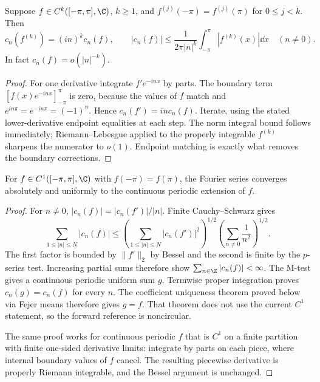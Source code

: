 \begin{theorem}
Suppose $f\in C^k([-\pi,\pi],\C)$, $k\geq1$, and
$f^{(j)}(-\pi)=f^{(j)}(\pi)$ for $0\leq j<k$. Then
\[
 c_n(f^{(k)})=(in)^k c_n(f),\qquad
 |c_n(f)|\leq\frac1{2\pi|n|^k}\int_{-\pi}^{\pi}|f^{(k)}(x)|\dd x
 \quad(n\ne0).
\]
In fact $c_n(f)=o(|n|^{-k})$.
\end{theorem}
\begin{proof}
For one derivative integrate $f'e^{-inx}$ by parts. The boundary term
$[f(x)e^{-inx}]_{-\pi}^{\pi}$ is zero, because the values of $f$ match
and $e^{in\pi}=e^{-in\pi}=(-1)^n$. Hence $c_n(f')=in c_n(f)$.
Iterate, using the stated lower-derivative endpoint equalities at each
step. The norm integral bound follows immediately; Riemann--Lebesgue
applied to the properly integrable $f^{(k)}$ sharpens the numerator to
$o(1)$. Endpoint matching is exactly what removes the boundary corrections.
\end{proof}

\begin{theorem}
For $f\in C^1([-\pi,\pi],\C)$ with $f(-\pi)=f(\pi)$,
the Fourier series converges absolutely and uniformly to the continuous
periodic extension of $f$.
\end{theorem}
\begin{proof}
For $n\ne0$, $|c_n(f)|=|c_n(f')|/|n|$. Finite Cauchy--Schwarz gives
\[
 \sum_{1\leq|n|\leq N}|c_n(f)|
 \leq\left(\sum_{1\leq|n|\leq N}|c_n(f')|^2\right)^{1/2}
      \left(\sum_{n\ne0}\frac1{n^2}\right)^{1/2}.
\]
The first factor is bounded by $\|f'\|_2$ by Bessel and the second is
finite by the $p$-series test. Increasing partial sums therefore show
$\sum_{n\in\Z}|c_n(f)|<\infty$. The M-test gives a continuous periodic
uniform sum $g$. Termwise proper integration proves $c_n(g)=c_n(f)$
for every $n$. The coefficient uniqueness theorem proved below via Fejer
means therefore gives $g=f$. That theorem does not use the current
$C^1$ statement, so the forward reference is noncircular.

The same proof works for continuous periodic $f$ that is $C^1$ on a finite
partition with finite one-sided derivative limits: integrate by parts on
each piece, where internal boundary values of $f$ cancel. The resulting
piecewise derivative is properly Riemann integrable, and the Bessel
argument is unchanged.
\end{proof}

